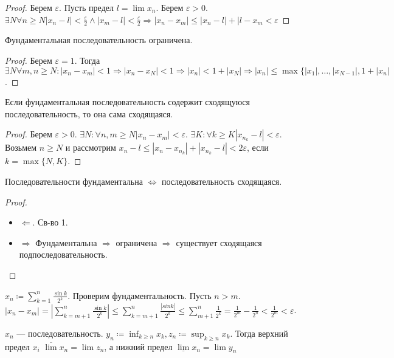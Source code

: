 \begin{proof}
    Берем $\varepsilon$. Пусть предел  $l = \lim x_n$. Берем  $\varepsilon>0$.  $\exists N \forall n \ge N |x_n - l| < \frac{\varepsilon}{2} \land |x_m - l| < \frac{\varepsilon}{2} \Rightarrow |x_n - x_m| \le |x_n - l| + |l - x_m < \varepsilon$ 
\end{proof}
\begin{property}
    Фундаментальная последовательность ограничена.
\end{property}
\begin{proof}
    Берем $\varepsilon=1$. Тогда  $\exists N \forall m, n \ge N: |x_n - x_m| < 1 \Rightarrow |x_n - x_N| < 1 \Rightarrow |x_n| < 1 + |x_N| \Rightarrow |x_n| \le \max\{|x_1|, \ldots, |x_{N-1}|, 1 + |x_n|$.
\end{proof}
\begin{property}
   Если фундаментальная последовательность содержит сходящуюся последовательность, то она сама сходящаяся.
\end{property}
\begin{proof}
    Берем $\varepsilon >0$.  $\exists N: \forall n, m \ge N |x_n - x_m| < \varepsilon$. $\exists K: \forall k \ge K |x_{n_k} - l| < \varepsilon$. Возьмем $n \ge N$ и рассмотрим $x_n - l \le |x_n - x_{n_k}| + |x_{n_k} -l| < 2 \varepsilon$, если $k = \max\{N, K\}$.
\end{proof}
\begin{theorem}
    Последовательности фундаментальна $\iff$ последовательность сходящаяся. 
\end{theorem}
\begin{proof}
    \slashn
    \begin{itemize}
        \item $\Leftarrow$. Св-во 1.
        \item  $\Rightarrow$ Фундаментальна  $\Rightarrow$ ограничена  $\Rightarrow$ существует сходящаяся подпоследовательность.
    \end{itemize}
\end{proof}
\begin{example}
    $x_n \coloneqq \displaystyle \sum_{k=1}^n \frac{\sin k}{2^k}$. Проверим фундаментальность. Пусть $n > m$.  $|x_n - x_m| = |\sum_{k=m+1}^n \frac{\sin k}{2^k}| \le \sum_{k=m+1}^n \frac{|sin k|}{2^k} \le \sum_{m+1}^n \frac{1}{2^k} = \frac{1}{2^m} - \frac{1}{2^n} < \frac{1}{2^m} < \varepsilon$.
\end{example}
\begin{definition}
    $x_n$ --- последовательность.  $y_n \coloneqq \inf_{k \ge n} x_k, z_n \coloneqq \sup_{k \ge n} x_k$. Тогда верхний предел $x_i$  $\overline{\lim} x_n = \lim z_n$, а нижний предел  $\underline{\lim} x_n = \lim y_n$
\end{definition}

